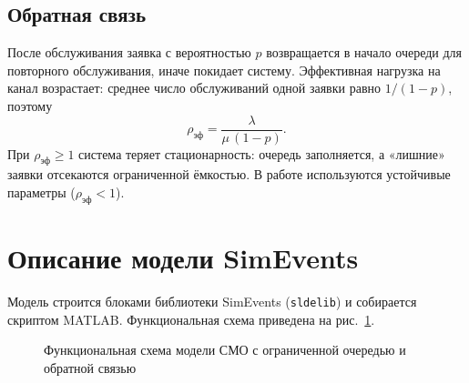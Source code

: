 \documentclass[a4paper,14pt,oneside,openany]{memoir}
\begin{document}
\subsection{Обратная связь}

После обслуживания заявка с вероятностью $p$ возвращается в начало очереди для повторного обслуживания, иначе покидает систему. Эффективная нагрузка на канал возрастает: среднее число обслуживаний одной заявки равно $1/(1-p)$, поэтому
\begin{equation}
    \rho_\text{эф} = \frac{\lambda}{\mu\,(1-p)}.
\end{equation}
При $\rho_\text{эф}\ge 1$ система теряет стационарность: очередь заполняется, а «лишние» заявки отсекаются ограниченной ёмкостью. В работе используются устойчивые параметры ($\rho_\text{эф}<1$).

\section{Описание модели SimEvents}

Модель строится блоками библиотеки SimEvents (\texttt{sldelib}) и собирается скриптом MATLAB. Функциональная схема приведена на рис.~\ref{fig:lab9_scheme}.

\begin{figure}[H]
\centering
{}
\caption{Функциональная схема модели СМО с ограниченной очередью и обратной связью}
\label{fig:lab9_scheme}
\end{figure}
\end{document}

